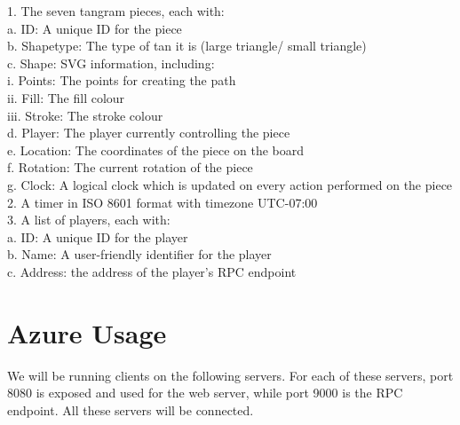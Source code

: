 \documentclass[twocolumn]{article}
\begin{document}
\begin{flushleft}
1. The seven tangram pieces, each with:\\
\hspace*{1em}a. ID: A unique ID for the piece\\
\hspace*{1em}b. Shapetype: The type of tan it is (large triangle/ small triangle)\\
\hspace*{1em}c. Shape: SVG information, including:\\
\hspace*{2em}i. Points: The points for creating the path\\
\hspace*{2em}ii. Fill: The fill colour\\
\hspace*{2em}iii. Stroke: The stroke colour\\
\hspace*{1em}d. Player: The player currently controlling the piece\\
\hspace*{1em}e. Location: The coordinates of the piece on the board\\
\hspace*{1em}f. Rotation: The current rotation of the piece\\
\hspace*{1em}g. Clock: A logical clock which is updated on every action performed on the piece\\
2. A timer in ISO 8601 format with timezone UTC-07:00\\
3. A list of players, each with:\\
\hspace*{1em}a. ID: A unique ID for the player\\
\hspace*{1em}b. Name: A user-friendly identifier for the player\\
\hspace*{1em}c. Address: the address of the player’s RPC endpoint
\end{flushleft}

\section{Azure Usage}
We will be running clients on the following servers. For each of these servers, port 8080 is exposed and used for the web server, while port 9000 is the RPC endpoint. All these servers will be connected.
\end{document}
